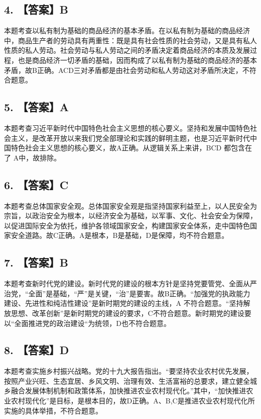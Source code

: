 \documentclass[UTF8,11pt]{ctexart}
\begin{document}
\subsection*{4. 【答案】B}

本题考查以私有制为基础的商品经济的基本矛盾。在以私有制为基础的商品经济中，商品生产者的劳动具有两重性：既是具有社会性质的社会劳动，又是具有私人性质的私人劳动。社会劳动与私人劳动之间的矛盾决定着商品经济的本质及发展过程，也是商品经济一切矛盾的基础，因而构成了以私有制为基础的商品经济的基本矛盾，故B正确。ACD三对矛盾都是由社会劳动和私人劳动这对矛盾所决定，不符合题意。


\subsection*{5. 【答案】A}

本题考查习近平新时代中国特色社会主义思想的核心要义。坚持和发展中国特色社会主义，是改革开放以来我们党全部理论和实践的鲜明主题，也是习近平新时代中国特色社会主义思想的核心要义，故A正确。从逻辑关系上来讲，BCD 都包含在了 A中，故排除。


\subsection*{6. 【答案】C}

本题考查总体国家安全观。总体国家安全观是指坚持国家利益至上，以人民安全为宗旨，以政治安全为根本，以经济安全为基础，以军事、文化、社会安全为保障，以促进国际安全为依托，维护各领域国家安全，构建国家安全体系，走中国特色国家安全道路。故C正确。A是根本，B是基础，D是保障，均不符合题意。


\subsection*{7. 【答案】B}

本题考查新时代党的建设。新时代党的建设的根本方针是坚持党要管党、全面从严治党，“全面”是基础，“严”是关键，“治”是要害。故B正确。“加强党的执政能力建设、先进性和纯洁性建设”是新时期党的建设的主线，A 不符合题意。“坚持解放思想、改革创新”是新时期党的建设的要求，C不符合题意。新时期党的建设要以“全面推进党的政治建设“为统领，D也不符合题意。


\subsection*{8. 【答案】D}

本题考查实施乡村振兴战略。党的十九大报告指出。“要坚持农业农村优先发展，按照产业兴旺、生态宜居、乡风文明、治理有效、生活富裕的总要求，建立健全城乡融合发展体制机制和政策体系，加快推进农业农村现代化。”其中，“加快推进农业农村现代化”是目标，是根本目的，故D正确。A、B,C是推进农业农村现代化所实施的具体举措，不符合题意。
\end{document}
